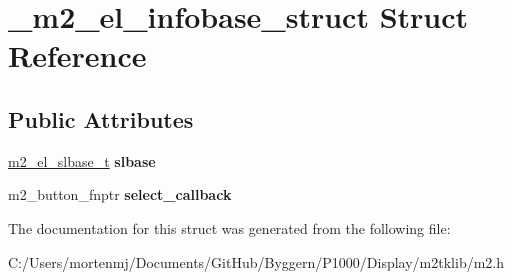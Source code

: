 \hypertarget{struct__m2__el__infobase__struct}{\section{\-\_\-m2\-\_\-el\-\_\-infobase\-\_\-struct Struct Reference}
\label{struct__m2__el__infobase__struct}
}
\subsection*{Public Attributes}
\begin{DoxyCompactItemize}
\item 
\hypertarget{struct__m2__el__infobase__struct_ac86614969ce1939d99bda5065f6a1870}{\hyperlink{struct__m2__el__slbase__struct}{m2\-\_\-el\-\_\-slbase\-\_\-t} {\bfseries slbase}}\label{struct__m2__el__infobase__struct_ac86614969ce1939d99bda5065f6a1870}

\item 
\hypertarget{struct__m2__el__infobase__struct_abc409a2de5ab05ec0e9e9df2dd40a838}{m2\-\_\-button\-\_\-fnptr {\bfseries select\-\_\-callback}}\label{struct__m2__el__infobase__struct_abc409a2de5ab05ec0e9e9df2dd40a838}

\end{DoxyCompactItemize}


The documentation for this struct was generated from the following file\-:\begin{DoxyCompactItemize}
\item 
C\-:/\-Users/mortenmj/\-Documents/\-Git\-Hub/\-Byggern/\-P1000/\-Display/m2tklib/m2.\-h\end{DoxyCompactItemize}
